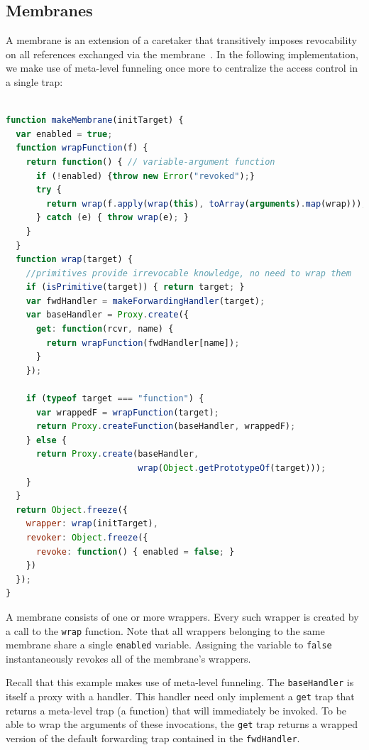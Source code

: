 \documentclass{sig-alternate}
\begin{document}
\subsection{Membranes}
\label{sub:membranes}

A membrane is an extension of a caretaker that transitively imposes revocability on all references exchanged via the membrane~\cite{miller06robust}. In the following implementation, we make use of meta-level funneling once more to centralize the access control in a single trap:
\\
\\
\begin{lstlisting}[language=javascript]
function makeMembrane(initTarget) {
  var enabled = true;
  function wrapFunction(f) {
    return function() { // variable-argument function
      if (!enabled) {throw new Error("revoked");}
      try {
        return wrap(f.apply(wrap(this), toArray(arguments).map(wrap)));
      } catch (e) { throw wrap(e); } 
    }
  }
  function wrap(target) {
    //primitives provide irrevocable knowledge, no need to wrap them
    if (isPrimitive(target)) { return target; }
    var fwdHandler = makeForwardingHandler(target);
    var baseHandler = Proxy.create({
      get: function(rcvr, name) {
        return wrapFunction(fwdHandler[name]);
      }
    });
    
    if (typeof target === "function") {
      var wrappedF = wrapFunction(target);
      return Proxy.createFunction(baseHandler, wrappedF);
    } else {
      return Proxy.create(baseHandler,
                          wrap(Object.getPrototypeOf(target)));
    }
  }
  return Object.freeze({
    wrapper: wrap(initTarget),
    revoker: Object.freeze({
      revoke: function() { enabled = false; }
    })
  });
}
\end{lstlisting}

A membrane consists of one or more wrappers. Every such wrapper is created by a call to the \texttt{wrap} function. Note that all wrappers belonging to the same membrane share a single \texttt{enabled} variable. Assigning the variable to \texttt{false} instantaneously revokes all of the membrane's wrappers.

Recall that this example makes use of meta-level funneling. The \texttt{baseHandler} is itself a proxy with a handler. This handler need only implement a \texttt{get} trap that returns a meta-level trap (a function) that will immediately be invoked. To be able to wrap the arguments of these invocations, the \texttt{get} trap returns a wrapped version of the default forwarding trap contained in the \texttt{fwdHandler}.
\end{document}
